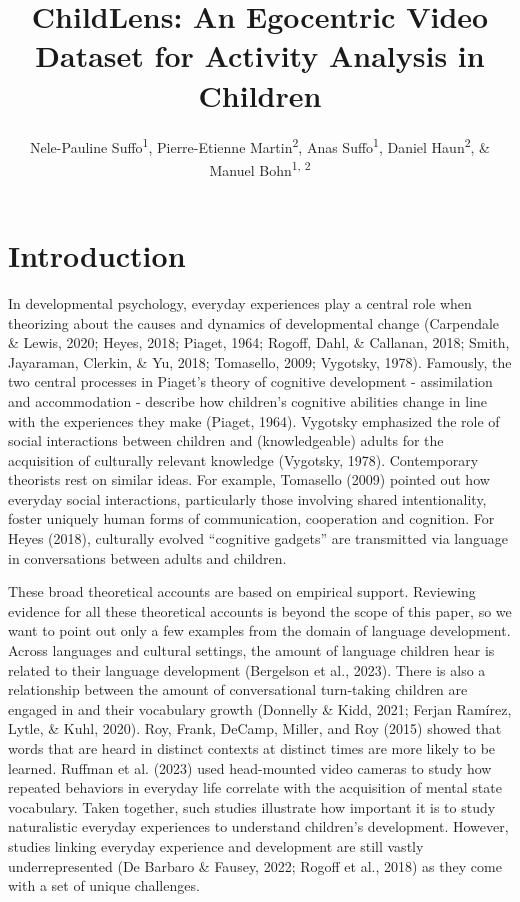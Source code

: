 \documentclass[
  man,floatsintext]{apa6}
\title{ChildLens: An Egocentric Video Dataset for Activity Analysis in Children}
\author{Nele-Pauline Suffo\textsuperscript{1}, Pierre-Etienne Martin\textsuperscript{2}, Anas Suffo\textsuperscript{1}, Daniel Haun\textsuperscript{2}, \& Manuel Bohn\textsuperscript{1, 2}}
\date{}
\affiliation{\vspace{0.5cm}\textsuperscript{1} Institute of Psychology in Education, Leuphana University Lüneburg, Universitätsallee 1, 21335 Lüneburg, Germany\\\textsuperscript{2} Comparative Cultural Psychology, Max Planck Institute for Evolutionary Anthropology, Deutscher Platz 6, Leipzig, 04103, Germany}
\begin{document}
\maketitle

\section{Introduction}\label{introduction}

In developmental psychology, everyday experiences play a central role when theorizing about the causes and dynamics of developmental change (Carpendale \& Lewis, 2020; Heyes, 2018; Piaget, 1964; Rogoff, Dahl, \& Callanan, 2018; Smith, Jayaraman, Clerkin, \& Yu, 2018; Tomasello, 2009; Vygotsky, 1978). Famously, the two central processes in Piaget's theory of cognitive development - assimilation and accommodation - describe how children's cognitive abilities change in line with the experiences they make (Piaget, 1964). Vygotsky emphasized the role of social interactions between children and (knowledgeable) adults for the acquisition of culturally relevant knowledge (Vygotsky, 1978). Contemporary theorists rest on similar ideas. For example, Tomasello (2009) pointed out how everyday social interactions, particularly those involving shared intentionality, foster uniquely human forms of communication, cooperation and cognition. For Heyes (2018), culturally evolved ``cognitive gadgets'' are transmitted via language in conversations between adults and children.

These broad theoretical accounts are based on empirical support. Reviewing evidence for all these theoretical accounts is beyond the scope of this paper, so we want to point out only a few examples from the domain of language development. Across languages and cultural settings, the amount of language children hear is related to their language development (Bergelson et al., 2023). There is also a relationship between the amount of conversational turn-taking children are engaged in and their vocabulary growth (Donnelly \& Kidd, 2021; Ferjan Ramírez, Lytle, \& Kuhl, 2020). Roy, Frank, DeCamp, Miller, and Roy (2015) showed that words that are heard in distinct contexts at distinct times are more likely to be learned. Ruffman et al. (2023) used head-mounted video cameras to study how repeated behaviors in everyday life correlate with the acquisition of mental state vocabulary. Taken together, such studies illustrate how important it is to study naturalistic everyday experiences to understand children's development. However, studies linking everyday experience and development are still vastly underrepresented (De Barbaro \& Fausey, 2022; Rogoff et al., 2018) as they come with a set of unique challenges.
\end{document}
